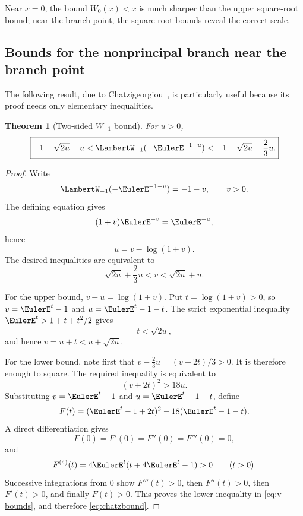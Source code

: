 \documentclass[11pt]{article}
\newtheorem{theorem}{Theorem}[section]
\theoremstyle{remark}
\newcommand{\Wm}{\LambertW_{-1}}
\begin{document}
Near \(x=0\), the bound \(W_0(x)<x\) is much sharper than the upper
square-root bound; near the branch point, the square-root bounds reveal the
correct scale.

\subsection{Bounds for the nonprincipal branch near the branch point}

The following result, due to Chatzigeorgiou~\cite{chatzigeorgiou2013}, is
particularly useful because its proof needs only elementary inequalities.

\begin{theorem}[Two-sided \(W_{-1}\) bound]\label{thm:chatzbound}
For \(u>0\),
\begin{equation}\label{eq:chatzbound}
 \boxed{\displaystyle
 -1-\sqrt{2u}-u
 <\Wm(-\EulerE^{-1-u})
 <-1-\sqrt{2u}-\frac23u.}
\end{equation}
\end{theorem}

\begin{proof}
Write
\[
       \Wm(-\EulerE^{-1-u})=-1-v,\qquad v>0.
\]
The defining equation gives
\[
       (1+v)\EulerE^{-v}=\EulerE^{-u},
\]
hence
\begin{equation}\label{eq:u-v}
       u=v-\log(1+v).
\end{equation}
The desired inequalities are equivalent to
\begin{equation}\label{eq:v-bounds}
       \sqrt{2u}+\frac23u<v<\sqrt{2u}+u.
\end{equation}

For the upper bound, \(v-u=\log(1+v)\).  Put
\(t=\log(1+v)>0\), so \(v=\EulerE^t-1\) and
\(u=\EulerE^t-1-t\).  The strict exponential inequality
\(\EulerE^t>1+t+t^2/2\) gives
\[
       t<\sqrt{2u},
\]
and hence \(v=u+t<u+\sqrt{2u}\).

For the lower bound, note first that \(v-\frac23u=(v+2t)/3>0\).
It is therefore enough to square.  The required inequality is equivalent to
\[
       (v+2t)^2>18u.
\]
Substituting \(v=\EulerE^t-1\) and \(u=\EulerE^t-1-t\), define
\[
 F(t)=(\EulerE^t-1+2t)^2-18(\EulerE^t-1-t).
\]
A direct differentiation gives
\[
 F(0)=F'(0)=F''(0)=F'''(0)=0,
\]
and
\[
       F^{(4)}(t)=4\EulerE^t(t+4\EulerE^t-1)>0\qquad(t>0).
\]
Successive integrations from \(0\) show
\(F'''(t)>0\), then \(F''(t)>0\), then \(F'(t)>0\), and finally
\(F(t)>0\).  This proves the lower inequality in
\eqref{eq:v-bounds}, and therefore \eqref{eq:chatzbound}.
\end{proof}
\end{document}
